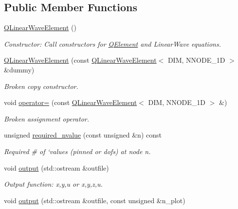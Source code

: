 \subsection*{Public Member Functions}
\begin{DoxyCompactItemize}
\item 
\hyperlink{classoomph_1_1QLinearWaveElement_ad87841cc70d3f2b6b1ce5ccbf4efbd22}{Q\+Linear\+Wave\+Element} ()
\begin{DoxyCompactList}\small\item\em Constructor\+: Call constructors for \hyperlink{classoomph_1_1QElement}{Q\+Element} and Linear\+Wave equations. \end{DoxyCompactList}\item 
\hyperlink{classoomph_1_1QLinearWaveElement_a0379e5690ec0f285d0e6281204f357d5}{Q\+Linear\+Wave\+Element} (const \hyperlink{classoomph_1_1QLinearWaveElement}{Q\+Linear\+Wave\+Element}$<$ D\+IM, N\+N\+O\+D\+E\+\_\+1D $>$ \&dummy)
\begin{DoxyCompactList}\small\item\em Broken copy constructor. \end{DoxyCompactList}\item 
void \hyperlink{classoomph_1_1QLinearWaveElement_acd9fed2d3150d2e129a80b7df54dfb71}{operator=} (const \hyperlink{classoomph_1_1QLinearWaveElement}{Q\+Linear\+Wave\+Element}$<$ D\+IM, N\+N\+O\+D\+E\+\_\+1D $>$ \&)
\begin{DoxyCompactList}\small\item\em Broken assignment operator. \end{DoxyCompactList}\item 
unsigned \hyperlink{classoomph_1_1QLinearWaveElement_a62c08bf0690b81184694b87424db4d46}{required\+\_\+nvalue} (const unsigned \&n) const
\begin{DoxyCompactList}\small\item\em Required \# of `values\textquotesingle{} (pinned or dofs) at node n. \end{DoxyCompactList}\item 
void \hyperlink{classoomph_1_1QLinearWaveElement_ae7176ab05b31f360cc7c774e857242d9}{output} (std\+::ostream \&outfile)
\begin{DoxyCompactList}\small\item\em Output function\+: x,y,u or x,y,z,u. \end{DoxyCompactList}\item 
void \hyperlink{classoomph_1_1QLinearWaveElement_a4e44576ef363b7b9680a60da96b7687b}{output} (std\+::ostream \&outfile, const unsigned \&n\+\_\+plot)

\end{DoxyCompactItemize}
